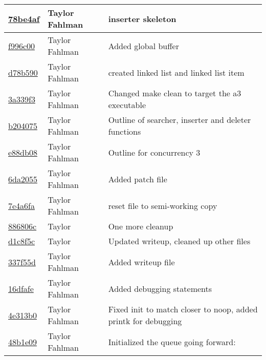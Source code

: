 \begin{tabular}{l l l}
\href{https://github.com/fahlmant/cs444/commit/78be4afe0b06da4185d41362312d3d124971ac9c}{78be4af} & Taylor Fahlman & inserter skeleton\\\hline
\href{https://github.com/fahlmant/cs444/commit/f996c006d61d3b31ba4570b25c11d30054dd0bd3}{f996c00} & Taylor Fahlman & Added global buffer\\\hline
\href{https://github.com/fahlmant/cs444/commit/d78b59016da477c48d733d257f3ff1f218cad153}{d78b590} & Taylor Fahlman & created linked list and linked list item\\\hline
\href{https://github.com/fahlmant/cs444/commit/3a339f3c25f472320ff955659e62ab5bef342bd1}{3a339f3} & Taylor Fahlman & Changed make clean to target the a3 executable\\\hline
\href{https://github.com/fahlmant/cs444/commit/b204075045d96c979c5f23c948a7aa96f7593ea5}{b204075} & Taylor Fahlman & Outline of searcher, inserter and deleter functions\\\hline
\href{https://github.com/fahlmant/cs444/commit/e88db0870f79e0fda434105d2b1a43ffe33248d0}{e88db08} & Taylor Fahlman & Outline for concurrency 3\\\hline
\href{https://github.com/fahlmant/cs444/commit/6da20559bf2fd5648a71e263be1fcddb68cb1786}{6da2055} & Taylor Fahlman & Added patch file\\\hline
\href{https://github.com/fahlmant/cs444/commit/7e4a6fad9eede1051a7ebc5db14bd3f360077816}{7e4a6fa} & Taylor Fahlman & reset file to semi-working copy\\\hline
\href{https://github.com/fahlmant/cs444/commit/886806cc8700041836984270d8457cb305283982}{886806c} & Taylor & One more cleanup\\\hline
\href{https://github.com/fahlmant/cs444/commit/d1c8f5c0597b0374c8fa150baf8654161f50eb83}{d1c8f5c} & Taylor & Updated writeup, cleaned up other files\\\hline
\href{https://github.com/fahlmant/cs444/commit/337f55d1a7a77b5840ab7cd55d3b98e6f8a4ea61}{337f55d} & Taylor Fahlman & Added writeup file\\\hline
\href{https://github.com/fahlmant/cs444/commit/16dfafe2b2ddaa55c00dc6f13d1624f5f348abdc}{16dfafe} & Taylor Fahlman & Added debugging statements\\\hline
\href{https://github.com/fahlmant/cs444/commit/4e313b07a7ce52c2eeb15e77780b0344fd58e776}{4e313b0} & Taylor Fahlman & Fixed init to match closer to noop, added printk for debugging\\\hline
\href{https://github.com/fahlmant/cs444/commit/48b1e091f6f8445fc355268ded9d2ab085f38217}{48b1e09} & Taylor Fahlman & Initialized the queue going forward:\\\hline

\end{tabular}
